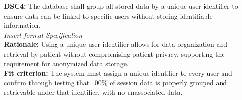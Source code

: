 \documentclass[12pt]{article}
\begin{document}
\textbf{DSC4: }The database shall group all stored data by a unique user identifier to ensure data can be linked to 
specific users without storing identifiable information.\\
\textit{Insert formal Specification}\\
\textbf{Rationale: }Using a unique user identifier allows for data organization and retrieval by patient without 
compromising patient privacy, supporting the requirement for anonymized data storage.\\
\textbf{Fit criterion: }The system must assign a unique identifier to every user and confirm through testing 
that 100\% of session data is properly grouped and retrievable under that identifier, with no unassociated 
data.\\\\
\end{document}
